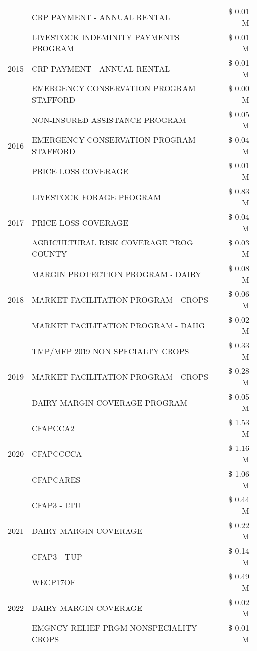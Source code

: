 \begin{tabular}{llr}
 & CRP PAYMENT - ANNUAL RENTAL & \$ 0.01 M \\
\cline{1-3}
\multirow[t]{3}{*}{2015} & LIVESTOCK INDEMINITY PAYMENTS PROGRAM & \$ 0.01 M \\
 & CRP PAYMENT - ANNUAL RENTAL & \$ 0.01 M \\
 & EMERGENCY CONSERVATION PROGRAM STAFFORD & \$ 0.00 M \\
\cline{1-3}
\multirow[t]{3}{*}{2016} & NON-INSURED ASSISTANCE PROGRAM & \$ 0.05 M \\
 & EMERGENCY CONSERVATION PROGRAM STAFFORD & \$ 0.04 M \\
 & PRICE LOSS COVERAGE & \$ 0.01 M \\
\cline{1-3}
\multirow[t]{3}{*}{2017} & LIVESTOCK FORAGE PROGRAM & \$ 0.83 M \\
 & PRICE LOSS COVERAGE & \$ 0.04 M \\
 & AGRICULTURAL RISK COVERAGE PROG - COUNTY & \$ 0.03 M \\
\cline{1-3}
\multirow[t]{3}{*}{2018} & MARGIN PROTECTION PROGRAM - DAIRY & \$ 0.08 M \\
 & MARKET FACILITATION PROGRAM - CROPS & \$ 0.06 M \\
 & MARKET FACILITATION PROGRAM - DAHG & \$ 0.02 M \\
\cline{1-3}
\multirow[t]{3}{*}{2019} & TMP/MFP 2019 NON SPECIALTY CROPS & \$ 0.33 M \\
 & MARKET FACILITATION PROGRAM - CROPS & \$ 0.28 M \\
 & DAIRY MARGIN COVERAGE PROGRAM & \$ 0.05 M \\
\cline{1-3}
\multirow[t]{3}{*}{2020} & CFAPCCA2 & \$ 1.53 M \\
 & CFAPCCCCA & \$ 1.16 M \\
 & CFAPCARES & \$ 1.06 M \\
\cline{1-3}
\multirow[t]{3}{*}{2021} & CFAP3 - LTU & \$ 0.44 M \\
 & DAIRY MARGIN COVERAGE & \$ 0.22 M \\
 & CFAP3 - TUP & \$ 0.14 M \\
\cline{1-3}
\multirow[t]{3}{*}{2022} & WECP17OF & \$ 0.49 M \\
 & DAIRY MARGIN COVERAGE & \$ 0.02 M \\
 & EMGNCY RELIEF PRGM-NONSPECIALITY CROPS & \$ 0.01 M \\
\cline{1-3}
\bottomrule
\end{tabular}

